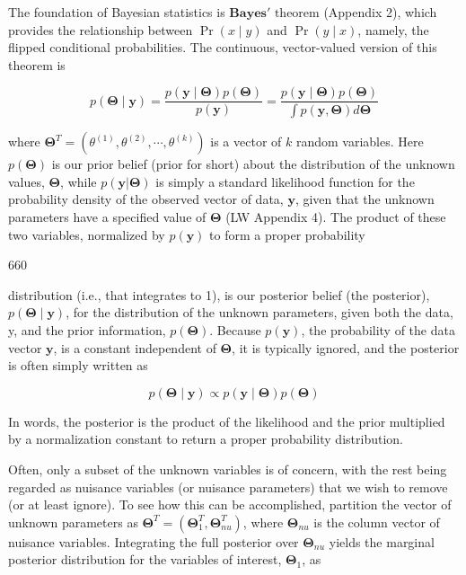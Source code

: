 \documentclass{article}
\begin{document}
The foundation of Bayesian statistics is  $ \mathbf{Bayes'} $  $ \text{theorem} $ (Appendix 2), which provides the relationship between  $ \Pr(x \mid y) $ and  $ \Pr(y \mid x) $, namely, the flipped conditional probabilities. The continuous, vector-valued version of this theorem is

\begin{equation}
p(\boldsymbol{\Theta}\mid\mathbf{y})=\frac{p(\mathbf{y}\mid\boldsymbol{\Theta})p(\boldsymbol{\Theta})}{p(\mathbf{y})}=\frac{p(\mathbf{y}\mid\boldsymbol{\Theta})p(\boldsymbol{\Theta})}{\int p(\mathbf{y},\boldsymbol{\Theta})d\boldsymbol{\Theta}}
\tag{19.29a}
\label{eq:19_29a}
\end{equation}

where  $ \boldsymbol{\Theta}^{T} = (\theta^{(1)}, \theta^{(2)}, \cdots, \theta^{(k)}) $ is a vector of  $ k $ random variables. Here  $ p(\boldsymbol{\Theta}) $ is our prior belief (prior for short) about the distribution of the unknown values,  $ \boldsymbol{\Theta} $, while  $ p(\mathbf{y} | \boldsymbol{\Theta}) $ is simply a standard likelihood function for the probability density of the observed vector of data,  $ \mathbf{y} $, given that the unknown parameters have a specified value of  $ \boldsymbol{\Theta} $ (LW Appendix 4). The product of these two variables, normalized by  $ p(\mathbf{y}) $ to form a proper probability

660

distribution (i.e., that integrates to 1), is our posterior belief (the posterior),  $ p(\boldsymbol{\Theta} \mid \mathbf{y}) $, for the distribution of the unknown parameters, given both the data, y, and the prior information,  $ p(\boldsymbol{\Theta}) $. Because  $ p(\mathbf{y}) $, the probability of the data vector  $ \mathbf{y} $, is a constant independent of  $ \boldsymbol{\Theta} $, it is typically ignored, and the posterior is often simply written as

\begin{equation}
p(\boldsymbol{\Theta}\mid\mathbf{y})\propto p(\mathbf{y}\mid\boldsymbol{\Theta})p(\boldsymbol{\Theta})
\tag{19.29b}
\label{eq:19_29b}
\end{equation}

In words, the posterior is the product of the likelihood and the prior multiplied by a normalization constant to return a proper probability distribution.

Often, only a subset of the unknown variables is of concern, with the rest being regarded as nuisance variables (or nuisance parameters) that we wish to remove (or at least ignore). To see how this can be accomplished, partition the vector of unknown parameters as  $ \boldsymbol{\Theta}^T = (\boldsymbol{\Theta}_1^T, \boldsymbol{\Theta}_{nu}^T) $, where  $ \boldsymbol{\Theta}_{nu} $ is the column vector of nuisance variables. Integrating the full posterior over  $ \boldsymbol{\Theta}_{nu} $ yields the marginal posterior distribution for the variables of interest,  $ \boldsymbol{\Theta}_1 $, as
\end{document}
